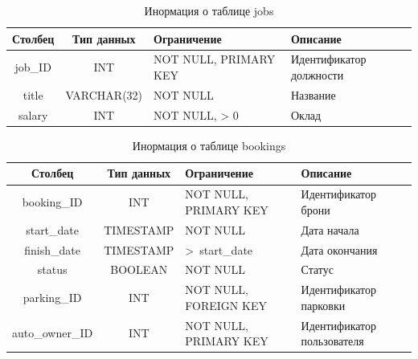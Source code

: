 \begin{table}[H]
	\begin{center}
		\begin{center}
			\caption{\label{tab:jobs}Инормация о таблице jobs}
		\end{center}
		\begin{tabular}{|c|c|p{3cm}|p{4cm}|}
			\hline 
			Столбец & Тип данных & Ограничение & Описание \\ \hline
			job\_ID & INT & NOT NULL, PRIMARY KEY & Идентификатор должности \\ \hline
	        title &  VARCHAR(32)  & NOT NULL & Название  \\ \hline
	        salary &  INT & NOT NULL, > 0 & Оклад  \\ \hline
		\end{tabular}
	\end{center}
\end{table}

\begin{table}[H]
	\begin{center}
		\begin{center}
			\caption{\label{tab:bookings}Инормация о таблице bookings}
		\end{center}
		\begin{tabular}{|c|c|p{3cm}|p{4cm}|}
			\hline 
			Столбец & Тип данных & Ограничение & Описание \\ \hline
			booking\_ID & INT & NOT NULL, PRIMARY KEY & Идентификатор брони \\ \hline
	        start\_date & TIMESTAMP  & NOT NULL & Дата начала  \\ \hline
	        finish\_date &  TIMESTAMP & >~start\_date & Дата окончания  \\ \hline
	        status & BOOLEAN & NOT NULL & Статус \\ \hline
	        parking\_ID & INT & NOT NULL, FOREIGN KEY & Идентификатор парковки \\ \hline
	        auto\_owner\_ID & INT & NOT NULL, PRIMARY KEY & Идентификатор пользователя \\ \hline
		\end{tabular}
	\end{center}
\end{table}

